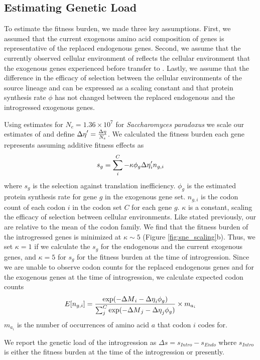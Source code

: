 \subsection*{Estimating Genetic Load}

To estimate the fitness burden, we made three key assumptions.
First, we assumed that the current exogenous amino acid composition of genes is representative of the replaced endogenous genes.
Second, we assume that the currently observed cellular environment of \gossypii reflects the cellular environment that the exogenous genes experienced before transfer to \kluyveri.
Lastly, we assume that the difference in the efficacy of selection between the cellular environments of the source lineage and \kluyveri can be expressed as a scaling constant and that protein synthesis rate $\phi$ has not changed between the replaced endogenous and the introgressed exogenous genes.

Using estimates for $N_e = 1.36\times10^7$ \citep{wagner2005} for \textit{Saccharomyces paradoxus} we scale our estimates of \DE and define ${\Delta \eta}' = \frac{{\Delta \eta}}{N_e}$.
We calculated the fitness burden each gene represents assuming additive fitness effects as 
\begin{equation}
s_g = \sum_i^{C} -\kappa \phi_g {\Delta \eta}'_i n_{g,i} 
\end{equation}
where $s_g$ is the selection against translation inefficiency.
$\phi_g$ is the estimated protein synthesis rate for gene $g$ in the exogenous gene set.
$n_{g,i}$ is the codon count of each codon $i$ in the codon set $C$ for each gene $g$.
$\kappa$ is a constant, scaling the efficacy of selection between cellular environments.
Like stated previously, our \DE are relative to the mean of the codon family.
We find that the fitness burden of the introgressed genes  is minimized at $\kappa \sim 5$ (Figure \ref{fig:sne_scaling}b).
Thus, we set $\kappa = 1$ if we calculate the $s_g$ for the endogenous and the current exogenous genes, and $\kappa = 5$ for $s_g$ for the fitness burden at the time of introgression.
Since we are unable to observe codon counts for the replaced endogenous genes and for the exogenous genes at the time of introgression, we calculate expected codon counts
\begin{equation}
E[n_{g,i}] = \frac{\exp(-{\Delta M}_i -{\Delta \eta}_i\phi_g)}{\sum_j^C \exp(-{\Delta M}_j -{\Delta \eta}_j\phi_g)}\times m_{a_i}
\end{equation} 
$m_{a_i}$ is the number of occurrences of amino acid $a$ that codon $i$ codes for.

We report the genetic load of the introgression as $\Delta s = s_{Intro} - s_{Endo}$ where $s_{Intro}$ is either the fitness burden at the time of the introgression or presently.

